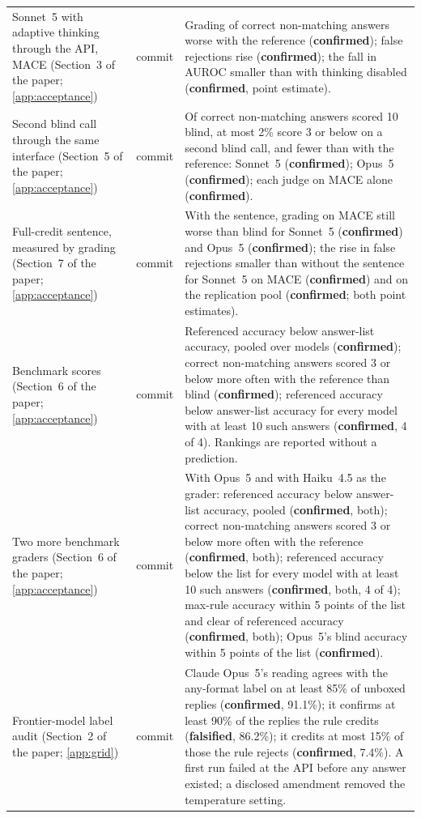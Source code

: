 {\begin{longtable}{L{3.2cm}L{1.1cm}L{8.7cm}}
Sonnet~5 with adaptive thinking through the API, \textsc{MACE} (Section~3 of the paper; \cref{app:acceptance}) & commit & Grading of correct non-matching answers worse with the reference (\textbf{confirmed}); false rejections rise (\textbf{confirmed}); the fall in AUROC smaller than with thinking disabled (\textbf{confirmed}, point estimate). \\
Second blind call through the same interface (Section~5 of the paper; \cref{app:acceptance}) & commit & Of correct non-matching answers scored 10 blind, at most 2\% score 3 or below on a second blind call, and fewer than with the reference: Sonnet~5 (\textbf{confirmed}); Opus~5 (\textbf{confirmed}); each judge on \textsc{MACE} alone (\textbf{confirmed}). \\
Full-credit sentence, measured by grading (Section~7 of the paper; \cref{app:acceptance}) & commit & With the sentence, grading on \textsc{MACE} still worse than blind for Sonnet~5 (\textbf{confirmed}) and Opus~5 (\textbf{confirmed}); the rise in false rejections smaller than without the sentence for Sonnet~5 on \textsc{MACE} (\textbf{confirmed}) and on the replication pool (\textbf{confirmed}; both point estimates). \\
Benchmark scores (Section~6 of the paper; \cref{app:acceptance}) & commit & Referenced accuracy below answer-list accuracy, pooled over models (\textbf{confirmed}); correct non-matching answers scored 3 or below more often with the reference than blind (\textbf{confirmed}); referenced accuracy below answer-list accuracy for every model with at least 10 such answers (\textbf{confirmed}, 4 of 4). Rankings are reported without a prediction. \\
Two more benchmark graders (Section~6 of the paper; \cref{app:acceptance}) & commit & With Opus~5 and with Haiku~4.5 as the grader: referenced accuracy below answer-list accuracy, pooled (\textbf{confirmed}, both); correct non-matching answers scored 3 or below more often with the reference (\textbf{confirmed}, both); referenced accuracy below the list for every model with at least 10 such answers (\textbf{confirmed}, both, 4 of 4); max-rule accuracy within 5 points of the list and clear of referenced accuracy (\textbf{confirmed}, both); Opus~5's blind accuracy within 5 points of the list (\textbf{confirmed}). \\
Frontier-model label audit (Section~2 of the paper; \cref{app:grid}) & commit & Claude Opus~5's reading agrees with the any-format label on at least 85\% of unboxed replies (\textbf{confirmed}, 91.1\%); it confirms at least 90\% of the replies the rule credits (\textbf{falsified}, 86.2\%); it credits at most 15\% of those the rule rejects (\textbf{confirmed}, 7.4\%). A first run failed at the API before any answer existed; a disclosed amendment removed the temperature setting. \\

\end{longtable}}
